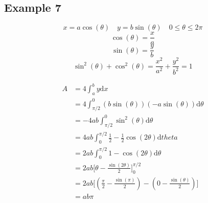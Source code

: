 \documentclass[letterpaper, 12pt]{article}
\newcommand*{\diff}{\mathrm{d}}
\begin{document}
\subsection*{Example 7}
\[ x = a\cos(\theta) \quad y = b\sin(\theta) \quad 0 \leq \theta \leq 2\pi \]
\[ \cos(\theta) = \frac{x}{a} \]
\[ \sin(\theta) = \frac{y}{b} \]
\[ \sin^{2}(\theta)+\cos^{2}(\theta) =
   \frac{x^{2}}{a^{2}}+\frac{y^{2}}{b^{2}} = 1 \]
\begin{center}
\end{center}
\begin{align*}
  A &= 4\int_{a}^{b}{y\diff{x}} \\
  &= 4\int_{\pi/2}^{0}{(b\sin(\theta))(-a\sin(\theta))\diff{\theta}} \\
  &= -4ab\int_{\pi/2}^{0}{\sin^{2}(\theta)\diff{\theta}} \\
  &= 4ab\int_{0}^{\pi/2}{\frac{1}{2}-\frac{1}{2}\cos(2\theta)\diff{theta}} \\
  &= 2ab\int_{0}^{\pi/2}{1-\cos(2\theta)\diff{\theta}} \\
  &= 2ab\bigg[\theta-\frac{\sin(2\theta)}{2}\bigg]_{0}^{\pi/2} \\
  &= 2ab\bigg[(\frac{\pi}{2}-\frac{\sin(\pi)}{2})-
    (0-\frac{\sin(\theta)}{2})\bigg] \\
  &= ab\pi
\end{align*}
\end{document}
